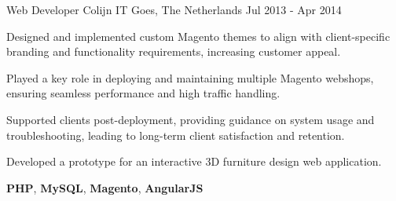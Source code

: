 \begin{cventries}
  \cventry
    {Web Developer} %
    {Colijn IT} %
    {Goes, The Netherlands} %
    {Jul 2013 - Apr 2014} %
    {
      \begin{cvitems} %
        \item {Designed and implemented custom Magento themes to align with client-specific branding and functionality requirements, increasing customer appeal.}
        \item {Played a key role in deploying and maintaining multiple Magento webshops, ensuring seamless performance and high traffic handling.  }
        \item {Supported clients post-deployment, providing guidance on system usage and troubleshooting, leading to long-term client satisfaction and retention.}
        \item {Developed a prototype for an interactive 3D furniture design web application.}
      \end{cvitems}
    }
    {\textbf{PHP}, \textbf{MySQL}, \textbf{Magento}, \textbf{AngularJS}}

\end{cventries}

